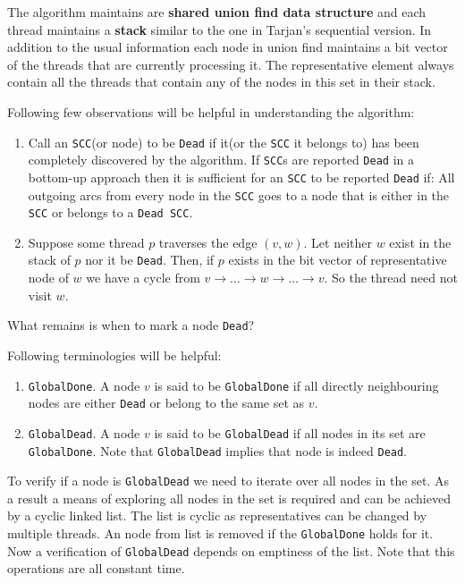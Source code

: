 \documentclass[a4paper]{article}
\begin{document}
The algorithm maintains are \textbf{shared union find data structure} and each thread maintains a \textbf{stack} similar to the one in Tarjan's sequential version.
In addition to the usual information each node in union find maintains a bit vector of the threads that are currently processing it. The representative element always contain all the threads that contain any of the nodes in this set in their stack.

Following few observations will be helpful in understanding the algorithm:
\begin{enumerate}
    \item Call an \texttt{SCC}(or node) to be \texttt{Dead} if it(or the \texttt{SCC} it belongs to) has been completely discovered by the algorithm.
    If \texttt{SCC}s are reported \texttt{Dead} in a bottom-up approach then it is sufficient for an \texttt{SCC} to be reported \texttt{Dead} if: All outgoing arcs from every node in the \texttt{SCC} goes to a node that is either in the \texttt{SCC} or belongs to a \texttt{Dead SCC}.
    \item Suppose some thread $p$ traverses the edge $(v, w)$. Let neither $w$ exist in the stack of $p$ nor it be \texttt{Dead}. Then, if $p$ exists in the bit vector of representative node of $w$ we have a cycle from $v \rightarrow \dots \rightarrow w \rightarrow \dots \rightarrow v$. So the thread need not visit $w$.  
\end{enumerate}

What remains is when to mark a node \texttt{Dead}?

Following terminologies will be helpful:
\begin{enumerate}
    \item \texttt{GlobalDone}. A node $v$ is said to be \texttt{GlobalDone} if all directly neighbouring nodes are either \texttt{Dead} or belong to the same set as $v$.
    \item \texttt{GlobalDead}. A node $v$ is said to be \texttt{GlobalDead} if all nodes in its set are \texttt{GlobalDone}. Note that \texttt{GlobalDead} implies that node is indeed \texttt{Dead}.
\end{enumerate}

To verify if a node is \texttt{GlobalDead} we need to iterate over all nodes in the set.
As a result a means of exploring all nodes in the set is required and can be achieved by a cyclic linked list. The list is cyclic as representatives can be changed by multiple threads.
An node from list is removed if the \texttt{GlobalDone} holds for it. Now a verification of \texttt{GlobalDead} depends on emptiness of the list. Note that this operations are all constant time.
\end{document}
